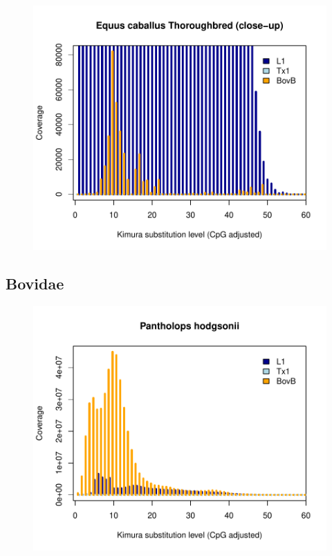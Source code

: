 \documentclass[12pt,a4paper,times]{article}
\begin{document}
\begin{figure}[H]
	\centering
	\includegraphics[scale=0.8]{suppFigures/divergencePlots/Equus_caballus_Thoroughbred_closeup.pdf}
	\caption{\label{Equus_caballus_Thoroughbred_closeup}}
\end{figure}

\subsection*{Bovidae}

\begin{figure}[H]
	\centering
	\includegraphics[scale=0.8]{suppFigures/divergencePlots/Pantholops_hodgsonii.pdf}
	\caption{\label{Pantholops}}
\end{figure}
\end{document}

